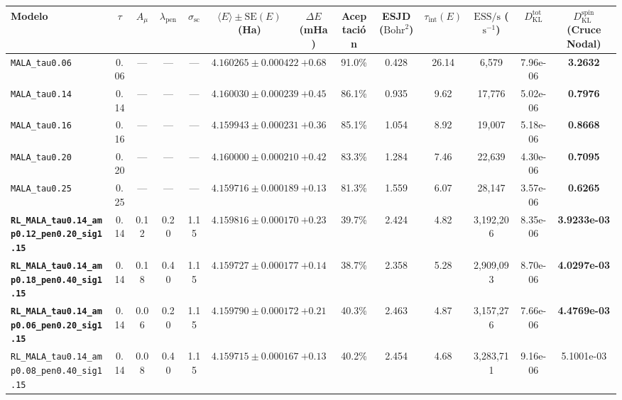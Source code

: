 \documentclass[10pt,a4paper]{article}
\begin{document}
\begin{table}[H]
\centering
\begin{adjustbox}{max width=\textwidth}
\begin{tabular}{lcccccccccccc}
\toprule
\textbf{Modelo} & \textbf{$\tau$} & \textbf{$A_\mu$} & \textbf{$\lambda_{\mathrm{pen}}$} & \textbf{$\sigma_{\mathrm{sc}}$} & \textbf{$\langle E \rangle \pm \mathrm{SE}(E)$ (Ha)} & \textbf{$\Delta E$ (mHa)} & \textbf{Aceptación} & \textbf{ESJD ($\text{Bohr}^2$)} & \textbf{$\tau_{\mathrm{int}}(E)$} & \textbf{$\mathrm{ESS/s}$ ($\text{s}^{-1}$)} & \textbf{$D_{\mathrm{KL}}^{\mathrm{tot}}$} & \textbf{$D_{\mathrm{KL}}^{\mathrm{spin}}$ (Cruce Nodal)} \\
\midrule
\texttt{MALA\_tau0.06} & 0.06 & --- & --- & --- & $4.160265 \pm 0.000422$ & $+0.68$ & 91.0\% & 0.428 & 26.14 & 6,579 & 7.96e-06 & \textbf{3.2632} \\
\texttt{MALA\_tau0.14} & 0.14 & --- & --- & --- & $4.160030 \pm 0.000239$ & $+0.45$ & 86.1\% & 0.935 & 9.62 & 17,776 & 5.02e-06 & \textbf{0.7976} \\
\texttt{MALA\_tau0.16} & 0.16 & --- & --- & --- & $4.159943 \pm 0.000231$ & $+0.36$ & 85.1\% & 1.054 & 8.92 & 19,007 & 5.18e-06 & \textbf{0.8668} \\
\texttt{MALA\_tau0.20} & 0.20 & --- & --- & --- & $4.160000 \pm 0.000210$ & $+0.42$ & 83.3\% & 1.284 & 7.46 & 22,639 & 4.30e-06 & \textbf{0.7095} \\
\texttt{MALA\_tau0.25} & 0.25 & --- & --- & --- & $4.159716 \pm 0.000189$ & $+0.13$ & 81.3\% & 1.559 & 6.07 & 28,147 & 3.57e-06 & \textbf{0.6265} \\
\textbf{\texttt{RL\_MALA\_tau0.14\_amp0.12\_pen0.20\_sig1.15}} & 0.14 & 0.12 & 0.20 & 1.15 & $4.159816 \pm 0.000170$ & $+0.23$ & 39.7\% & 2.424 & 4.82 & 3,192,206 & 8.35e-06 & \textbf{3.9233e-03} \\
\textbf{\texttt{RL\_MALA\_tau0.14\_amp0.18\_pen0.40\_sig1.15}} & 0.14 & 0.18 & 0.40 & 1.15 & $4.159727 \pm 0.000177$ & $+0.14$ & 38.7\% & 2.358 & 5.28 & 2,909,093 & 8.70e-06 & \textbf{4.0297e-03} \\
\textbf{\texttt{RL\_MALA\_tau0.14\_amp0.06\_pen0.20\_sig1.15}} & 0.14 & 0.06 & 0.20 & 1.15 & $4.159790 \pm 0.000172$ & $+0.21$ & 40.3\% & 2.463 & 4.87 & 3,157,276 & 7.66e-06 & \textbf{4.4769e-03} \\
\texttt{RL\_MALA\_tau0.14\_amp0.08\_pen0.40\_sig1.15} & 0.14 & 0.08 & 0.40 & 1.15 & $4.159715 \pm 0.000167$ & $+0.13$ & 40.2\% & 2.454 & 4.68 & 3,283,711 & 9.16e-06 & 5.1001e-03 \\

\end{tabular}
\end{adjustbox}
\end{table}
\end{document}
